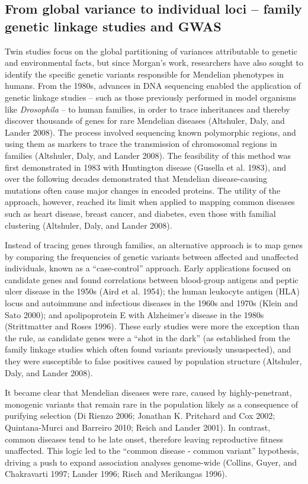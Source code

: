 \documentclass[
]{book}
\begin{document}
\hypertarget{GWAS}{%
\subsection{From global variance to individual loci -- family genetic linkage studies and GWAS}\label{GWAS}}

Twin studies focus on the global partitioning of variances attributable to genetic and environmental facts, but since Morgan's work, researchers have also sought to identify the specific genetic variants responsible for Mendelian phenotypes in humans. From the 1980s, advances in DNA sequencing enabled the application of genetic linkage studies -- such as those previously performed in model organisms like \emph{Drosophila} -- to human families, in order to trace inheritances and thereby discover thousands of genes for rare Mendelian diseases (Altshuler, Daly, and Lander 2008). The process involved sequencing known polymorphic regions, and using them as markers to trace the transmission of chromosomal regions in families (Altshuler, Daly, and Lander 2008). The feasibility of this method was first demonstrated in 1983 with Huntington disease (Gusella et al. 1983), and over the following decades demonstrated that Mendelian disease-causing mutations often cause major changes in encoded proteins. The utility of the approach, however, reached its limit when applied to mapping common diseases such as heart disease, breast cancer, and diabetes, even those with familial clustering (Altshuler, Daly, and Lander 2008).

Instead of tracing genes through families, an alternative approach is to map genes by comparing the frequencies of genetic variants between affected and unaffected individuals, known as a ``case-control'' approach. Early applications focused on candidate genes and found correlations between blood-group antigens and peptic ulcer disease in the 1950s (Aird et al. 1954); the human leukocyte antigen (HLA) locus and autoimmune and infectious diseases in the 1960s and 1970s (Klein and Sato 2000); and apolipoprotein E with Alzheimer's disease in the 1980s (Strittmatter and Roses 1996). These early studies were more the exception than the rule, as candidate genes were a ``shot in the dark'' (as established from the family linkage studies which often found variants previously unsuspected), and they were susceptible to false positives caused by population structure (Altshuler, Daly, and Lander 2008).

It became clear that Mendelian diseases were rare, caused by highly-penetrant, monogenic variants that remain rare in the population likely as a consequence of purifying selection (Di Rienzo 2006; Jonathan K. Pritchard and Cox 2002; Quintana-Murci and Barreiro 2010; Reich and Lander 2001). In contrast, common diseases tend to be late onset, therefore leaving reproductive fitness unaffected. This logic led to the ``common disease - common variant'' hypothesis, driving a push to expand association analyses genome-wide (Collins, Guyer, and Chakravarti 1997; Lander 1996; Risch and Merikangas 1996).
\end{document}
